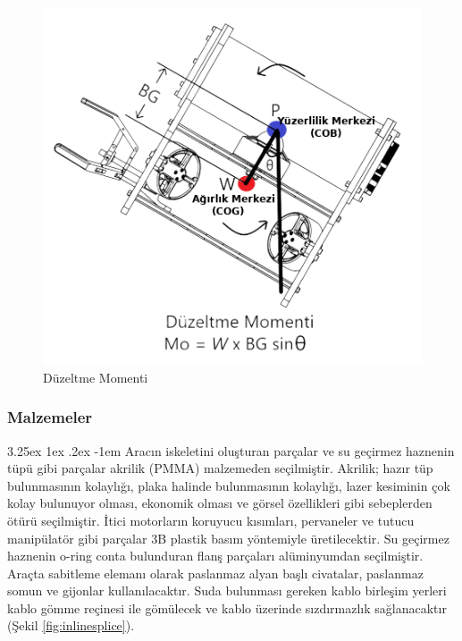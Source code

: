 \documentclass[12pt]{article}
\makeatletter
\renewcommand\paragraph{\@startsection{paragraph}{5}{\z@}%
  {3.25ex \@plus1ex \@minus.2ex}%
  {-1em}%
  {\normalfont\normalsize\bfseries}}
\makeatother
\begin{document}
\begin{figure}[hbt!]
\centering
 \begin{adjustbox}{width=10cm}
\includegraphics[width=1\textwidth]{moment.png}
 \end{adjustbox}
\caption{Düzeltme Momenti}
\label{fig:moment}
\end{figure}


\subsubsection{Malzemeler}

\paragraph{} Aracın iskeletini oluşturan parçalar ve su geçirmez haznenin tüpü gibi parçalar akrilik (PMMA) malzemeden seçilmiştir. Akrilik; hazır tüp bulunmasının kolaylığı, plaka halinde bulunmasının kolaylığı, lazer kesiminin çok kolay bulunuyor olması, ekonomik olması ve görsel özellikleri gibi sebeplerden ötürü seçilmiştir. İtici motorların koruyucu kısımları, pervaneler ve tutucu manipülatör gibi parçalar 3B plastik basım yöntemiyle üretilecektir. Su geçirmez haznenin o-ring conta bulunduran flanş parçaları alüminyumdan seçilmiştir. Araçta sabitleme elemanı olarak paslanmaz alyan başlı civatalar, paslanmaz somun ve gijonlar kullanılacaktır. Suda bulunması gereken kablo birleşim yerleri kablo gömme reçinesi ile gömülecek ve kablo üzerinde  sızdırmazlık sağlanacaktır (Şekil \ref{fig:inlinesplice}).
\end{document}
